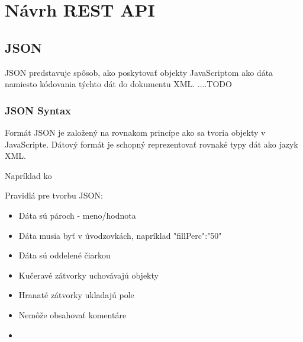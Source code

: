 \chapter{Návrh \acs{REST} \acs{API}}



\section{\acs{JSON}}


%
\ac{JSON} predstavuje spôsob, ako poskytovať objekty JavaScriptom ako dáta namiesto kódovania týchto dát do dokumentu XML. ....TODO \cite[p.~280]{Suehring}







\subsection{JSON Syntax}


Formát \ac{JSON} je založený na rovnakom princípe ako sa tvoria objekty v JavaScripte. Dátový formát je schopný reprezentovať rovnaké typy dát ako jazyk \acs{XML}. \cite[p.~622-4]{Zakas}

Napríklad ko  

Pravidlá pre tvorbu JSON:

\begin{itemize}
	\item Dáta sú pároch - meno/hodnota 
	\item Dáta musia byť v úvodzovkách, napríklad "fillPerc":"50"
	\item Dáta sú oddelené čiarkou
	\item Kučeravé zátvorky uchovávajú objekty
	\item Hranaté zátvorky ukladajú pole
	\item Nemôže obsahovať komentáre
	\item 
\end{itemize}

